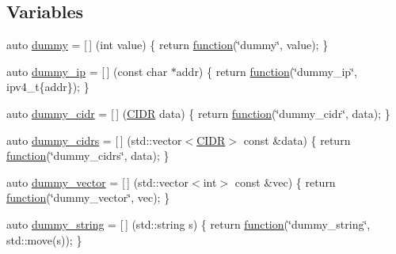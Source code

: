 \subsection*{Variables}
\begin{DoxyCompactItemize}
\item 
auto \hyperlink{namespacepfq_1_1lang_1_1experimental_1_1anonymous__namespace_02experimental_8hpp_03_a5fc8274e9598b8524f833264174b62b7}{dummy} = \mbox{[}$\,$\mbox{]} (int value) \{ return \hyperlink{namespacepfq_1_1lang_a1a4638059d700ae08d0ca63886ff2bb3}{function}(\char`\"{}dummy\char`\"{}, value); \}
\item 
auto \hyperlink{namespacepfq_1_1lang_1_1experimental_1_1anonymous__namespace_02experimental_8hpp_03_abc66a4fd883f91bb1fd0d4d369b2499c}{dummy\+\_\+ip} = \mbox{[}$\,$\mbox{]} (const char $\ast$addr) \{ return \hyperlink{namespacepfq_1_1lang_a1a4638059d700ae08d0ca63886ff2bb3}{function}(\char`\"{}dummy\+\_\+ip\char`\"{}, ipv4\+\_\+t\{addr\}); \}
\item 
auto \hyperlink{namespacepfq_1_1lang_1_1experimental_1_1anonymous__namespace_02experimental_8hpp_03_a331aab492ad841b1c7a0d95efea00e76}{dummy\+\_\+cidr} = \mbox{[}$\,$\mbox{]} (\hyperlink{structpfq_1_1lang_1_1CIDR}{C\+I\+DR} data) \{ return \hyperlink{namespacepfq_1_1lang_a1a4638059d700ae08d0ca63886ff2bb3}{function}(\char`\"{}dummy\+\_\+cidr\char`\"{}, data); \}
\item 
auto \hyperlink{namespacepfq_1_1lang_1_1experimental_1_1anonymous__namespace_02experimental_8hpp_03_ad239e0d3cd310dbf3b86ec109242aca1}{dummy\+\_\+cidrs} = \mbox{[}$\,$\mbox{]} (std\+::vector$<$\hyperlink{structpfq_1_1lang_1_1CIDR}{C\+I\+DR}$>$ const \&data) \{ return \hyperlink{namespacepfq_1_1lang_a1a4638059d700ae08d0ca63886ff2bb3}{function}(\char`\"{}dummy\+\_\+cidrs\char`\"{}, data); \}
\item 
auto \hyperlink{namespacepfq_1_1lang_1_1experimental_1_1anonymous__namespace_02experimental_8hpp_03_a8ee61246090fb5d74e96dbb7f19b7008}{dummy\+\_\+vector} = \mbox{[}$\,$\mbox{]} (std\+::vector$<$int$>$ const \&vec) \{ return \hyperlink{namespacepfq_1_1lang_a1a4638059d700ae08d0ca63886ff2bb3}{function}(\char`\"{}dummy\+\_\+vector\char`\"{}, vec); \}
\item 
auto \hyperlink{namespacepfq_1_1lang_1_1experimental_1_1anonymous__namespace_02experimental_8hpp_03_a354cb0bfb9d9033e9d87f03fba7c7267}{dummy\+\_\+string} = \mbox{[}$\,$\mbox{]} (std\+::string s) \{ return \hyperlink{namespacepfq_1_1lang_a1a4638059d700ae08d0ca63886ff2bb3}{function}(\char`\"{}dummy\+\_\+string\char`\"{}, std\+::move(s)); \}

\end{DoxyCompactItemize}
